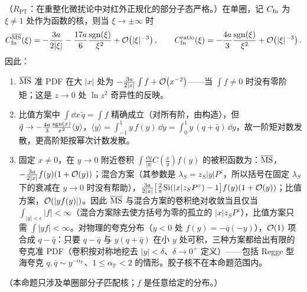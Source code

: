 \begin{proposition}\label{prop:lamet-tails}
（$R_{\mathrm{PT}}$：在重整化微扰论中对红外正规化的部分子态严格。）在单圈，记 $C_{\rm fn}$ 为 $\xi\ne1$ 处作为函数的核，则当 $\xi\to\pm\infty$ 时
\begin{equation}\label{eq:lamet-tails}
C^{\overline{\mathrm{MS}}}_{\rm fn}(\xi)=-\frac{3a}{2|\xi|}-\frac{17a}{6}\frac{{\rm sgn}(\xi)}{\xi^2}+\mathcal{O}\!\left(|\xi|^{-3}\right),\qquad C^{\rm ratio}_{\rm fn}(\xi)=-\frac{4a}{3}\frac{{\rm sgn}(\xi)}{\xi^2}+\mathcal{O}\!\left(|\xi|^{-3}\right).
\end{equation}%
因此：
\begin{enumerate}[label=(\roman*),leftmargin=2em,itemsep=1pt,topsep=2pt]
\item $\overline{\mathrm{MS}}$ 准 PDF 在大 $|x|$ 处为 $-\frac{3a}{2|x|}\int f+\mathcal{O}\!\left(x^{-2}\right)$——当 $\int f\neq0$ 时没有零阶矩；这是 $z\to0$ 处 $\ln z^2$ 奇异性的反映。
\item 比值方案中 $\int\dd x\,\tilde q=\int f$ 精确成立（对所有阶，由构造），但 $\tilde q\to-\frac{4a}3\frac{{\rm sgn}(x)}{x^2}\langle y\rangle$，$\langle y\rangle=\int_{-1}^1y\,f(y)\,\dd y=\int_0^1y\,(q+\bar q)\,\dd y$，故一阶矩对数发散，更高阶矩按幂次计数发散。
\item 固定 $x\neq0$，在 $y\to0$ 附近卷积 $\int\frac{\dd y}{|y|}C(\frac xy)f(y)$ 的被积函数为：$\overline{\mathrm{MS}}$，$-\frac{3a}{2|x|}f(y)(1+\mathcal{O}\!\left(y\right))$；混合方案（其参数是 $\lambda_S=z_S|y|P^z$，所以括号在固定 $\lambda_S$ 下的衰减在 $y\to0$ 时没有帮助），$\frac{3a}{2|x|}\big[\frac2\pi{\rm Si}(|x|z_SP^z)-1\big]f(y)(1+\mathcal{O}\!\left(y\right))$；比值方案，$\mathcal{O}\!\left(|yf(y)|\right)$。因此 $\overline{\mathrm{MS}}$ 与混合方案的卷积绝对收敛当且仅当 $\int_{|y|<\epsilon}|f|<\infty$（混合方案除去使方括号为零的孤立的 $|x|z_SP^z$），比值方案只需 $\int|yf|<\infty$。对物理的夸克分布（$y<0$ 处 $f(y)=-\bar q(-y)$），$\mathcal{O}\!\left(1\right)$ 项合成 $q-\bar q$：只要 $q-\bar q$ 与 $y(q+\bar q)$ 在小 $y$ 处可积，三种方案都给出有限的夸克准 PDF（卷积按对称地挖去 $|y|<\delta$、$\delta\to0^+$ 定义）——包括 Regge 型海夸克 $q,\bar q\sim y^{-\alpha_{\mathbb P}}$、$1\le\alpha_{\mathbb P}<2$ 的情形。胶子核不在本命题范围内。
\end{enumerate}
（本命题只涉及单圈部分子匹配核；$f$ 是任意给定的分布。）
\end{proposition}

